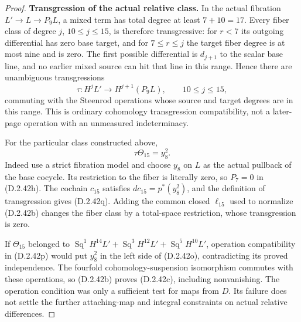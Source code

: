 \begin{proof}
\medskip\noindent
\textbf{Transgression of the actual relative class.}
In the actual fibration $L'\to L\to P_9L$, a mixed term
has total degree at least $7+10=17$.  Every fiber class of
degree $j$, $10\le j\le15$, is therefore transgressive:
for $r<7$ its outgoing differential has zero base target,
and for $7\le r\le j$ the target fiber degree is at most
nine and is zero.  The first possible differential is
$d_{j+1}$ to the scalar base line, and no earlier mixed
source can hit that line in this range.  Hence there are
unambiguous transgressions
\[
 \tau:H^jL'\longrightarrow H^{j+1}(P_9L),
             \qquad 10\le j\le15,
 \tag{D.2.42p}
\]
commuting with the Steenrod operations whose source and target
degrees are in this range.  This is ordinary cohomology
transgression compatibility, not a later-page operation with
an unmeasured indeterminacy.

For the particular class constructed above,
\[
                         \tau\Theta_{15}=y_8^2.
 \tag{D.2.42q}
\]
Indeed use a strict fibration model and choose $y_8$ on $L$
as the actual pullback of the base cocycle.  Its restriction
to the fiber is literally zero, so $P_7=0$ in
\textup{(D.2.42h)}.  The cochain $c_{15}$ satisfies
$dc_{15}=p^*(y_8^2)$, and the definition of transgression
gives \textup{(D.2.42q)}.  Adding the common closed
$\ell_{15}$ used to normalize \textup{(D.2.42b)} changes
the fiber class by a total-space restriction, whose
transgression is zero.

If $\Theta_{15}$ belonged to
$\operatorname{Sq}^1H^{14}L'+
\operatorname{Sq}^3H^{12}L'+
\operatorname{Sq}^5H^{10}L'$, operation compatibility in
\textup{(D.2.42p)} would put $y_8^2$ in the left side of
\textup{(D.2.42o)}, contradicting its proved independence.
The fourfold cohomology-suspension isomorphism commutes with
these operations, so \textup{(D.2.42b)} proves
\textup{(D.2.42c)}, including nonvanishing.
The operation condition was only a sufficient test for maps
from $D$.  Its failure does not settle the further attaching-map
and integral constraints on actual relative differences.
\end{proof}
